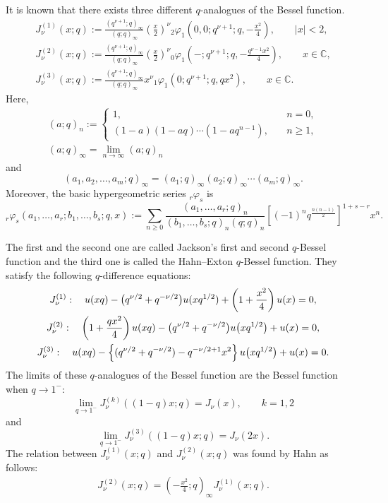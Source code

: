\documentclass[pdftex]{sigma}
\begin{document}
It is known that there exists three dif\/ferent $q$-analogues of the Bessel function.
\begin{gather*}
J_\nu^{(1)}(x;q) :=\frac{(q^{\nu +1};q)_\infty}{(q;q)_\infty}\left(\frac{x}{2}\right)^\nu {}_2\varphi_1\left(0,0;q^{\nu +1};q,-\frac{x^2}{4}\right),\qquad |x|<2,\\
J_\nu^{(2)}(x;q) :=\frac{(q^{\nu +1};q)_\infty}{(q;q)_\infty}\left(\frac{x}{2}\right)^\nu {}_0\varphi_1\left(-;q^{\nu +1};q,-\frac{q^{\nu -1}x^2}{4}\right),\qquad x\in\mathbb{C},\\
J_\nu^{(3)}(x;q) :=\frac{(q^{\nu +1};q)_\infty}{(q;q)_\infty}x^\nu {}_1\varphi_1\left(0;q^{\nu +1};q,qx^2\right),\qquad x\in\mathbb{C}.
\end{gather*}
Here,
\begin{gather*}
(a;q)_n:=
\begin{cases}
1,&\quad n=0,\\
(1-a)(1-aq)\cdots (1-aq^{n-1}),&\quad n\ge 1,
\end{cases}
\\
(a;q)_\infty =\lim_{n\to\infty}(a;q)_n
\end{gather*}
and
\[(a_1,a_2,\dots ,a_m;q)_\infty =(a_1;q)_\infty (a_2;q)_\infty\cdots (a_m;q)_\infty .\]
Moreover, the basic hypergeometric series ${}_r\varphi_s$ is
\[{_r\varphi_s}(a_1,\dots ,a_r;b_1,\dots ,b_s;q,x)
:=\sum_{n\ge 0}\frac{(a_1,\dots ,a_r;q)_n}{(b_1,\dots ,b_s;q)_n(q;q)_n}
\left[(-1)^nq^{\frac{n(n-1)}{2}}\right]^{1+s-r}x^n.\]


The f\/irst and the second one
are called Jackson's f\/irst and second $q$-Bessel function and the third one is called the Hahn--Exton $q$-Bessel function.
They satisfy the following $q$-dif\/ference equations:
\begin{gather}
J^{(1)}_\nu :\quad u(xq) -\big(q^{\nu/2} +q^{-\nu/2}\big) u(xq^{1/2}) +\left(1+\frac{x^2}4\right)u(x)=0,\notag %
\\
J^{(2)}_\nu :\quad \left(1+\frac{qx^2}4\right)u(xq) -\big(q^{\nu/2} +q^{-\nu/2}\big) u\big(xq^{1/2}\big) +u(x)=0,\notag \\
J^{(3)}_\nu :\quad u(xq) -\left\{(q^{\nu/2} +q^{-\nu/2}) -q^{-\nu/2+1}x^2\right\} u\big(xq^{1/2}\big) + u(x)=0. \label{j3}
\end{gather}
The limits of these $q$-analogues of the Bessel function are the Bessel function when $q\to 1^-$:
\[\lim_{q\to 1^-}J_\nu^{(k)}\left((1-q)x;q\right)=J_{\nu}(x),\qquad k=1,2\]
and
\[\lim_{q\to 1^-}J_\nu^{(3)}\left((1-q)x;q\right)=J_\nu (2x).\]
The relation between $J_\nu^{(1)}(x;q)$ and $J_\nu^{(2)}(x;q)$ was found by Hahn \cite{Hahn} as follows:
\begin{gather}\label{J1J2}
J_\nu^{(2)}(x;q)=\left(-\frac{x^2}{4};q\right)_\infty J_\nu^{(1)}(x;q).
\end{gather}
\end{document}
